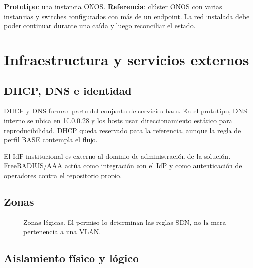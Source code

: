 \documentclass[11pt,a4paper]{article}
\begin{document}
\textbf{Prototipo}: una instancia ONOS. \textbf{Referencia}: clúster ONOS con varias instancias y switches configurados con más de un endpoint. La red instalada debe poder continuar durante una caída y luego reconciliar el estado.

\section{Infraestructura y servicios externos}

\subsection{DHCP, DNS e identidad}

DHCP y DNS forman parte del conjunto de servicios base. En el prototipo, DNS interno se ubica en 10.0.0.28 y los hosts usan direccionamiento estático para reproducibilidad. DHCP queda reservado para la referencia, aunque la regla de perfil BASE contempla el flujo.

El IdP institucional es externo al dominio de administración de la solución. FreeRADIUS/AAA actúa como integración con el IdP y como autenticación de operadores contra el repositorio propio.

\subsection{Zonas}

\begin{figure}[H]
\centering
{}
\caption{Zonas lógicas. El permiso lo determinan las reglas SDN, no la mera pertenencia a una VLAN.}
\end{figure}

\subsection{Aislamiento físico y lógico}
\end{document}
